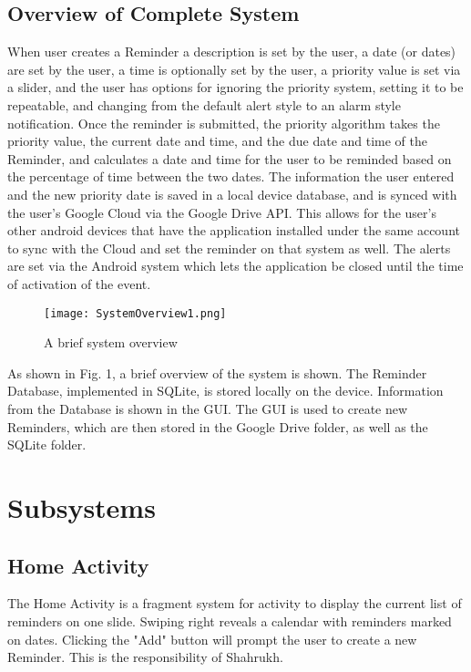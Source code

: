 \documentclass[12pt]{article}
\begin{document}
\subsection{Overview of Complete System}
When user creates a Reminder a description is set by the user, a date (or dates)  are set by the user, a time is optionally set by the user, a priority value is set via a slider, and the user has options for ignoring the priority system, setting it to be repeatable, and changing from the default alert style to an alarm style notification. Once the reminder is submitted, the priority algorithm takes the priority value, the current date and time, and the due date and time of the Reminder, and calculates a date and time for the user to be reminded based on the percentage of time between the two dates. The information the user entered and the new priority date is saved in a local device database, and is synced with the user's Google Cloud via the Google Drive API. This allows for the user's other android devices that have the application installed under the same account to sync with the Cloud and set the reminder on that system as well. The alerts are set via the Android system which lets the application be closed until the time of activation of the event.

\begin{figure}[h]
\texttt{[image: SystemOverview1.png]}
\centering
\caption{A brief system overview}
\end{figure}

As shown in Fig. 1, a brief overview of the system is shown. The Reminder Database, implemented in SQLite, is stored locally on the device. Information from the Database is shown in the GUI. The GUI is used to create new Reminders, which are then stored in the Google Drive folder, as well as the SQLite folder.

\section{Subsystems}
\subsection{Home Activity}
The Home Activity is a fragment system for activity to display the current list of reminders on one slide. Swiping right reveals a calendar with reminders marked on dates. Clicking the "Add" button will prompt the user to create a new Reminder. This is the responsibility of Shahrukh. 
\end{document}
